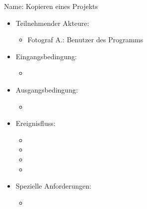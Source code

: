 \begin{itemize}
		Name: Kopieren eines Projekts
		\begin{itemize}
			\item Teilnehmender Akteure:
			\begin{itemize}
				\item	Fotograf A.: Benutzer des Programms		
			\end{itemize}
			\item Eingangsbedingung:
			\begin{itemize}
				\item			
			\end{itemize}
			\item Ausgangsbedingung:
			\begin{itemize}
				\item			
			\end{itemize}
			\item Ereignisfluss:
			\begin{itemize}
				\item
				\item
				\item
				\item							
			\end{itemize}
			\item Spezielle Anforderungen:
			\begin{itemize}
				\item			
			\end{itemize}			
		\end{itemize}	
	\end{itemize}
